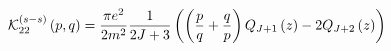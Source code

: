\begin{equation}
\mathcal{K}_{22}^{\left( s-s\right) }\left( p,q\right) =\frac{\pi e^{2}}{%
2m^{2}}\frac{1}{2J+3}\left( \left( \frac{p}{q}+\frac{q}{p}\right)
Q_{J+1}\left( z\right) -2Q_{J+2}\left( z\right) \right)
\end{equation}

